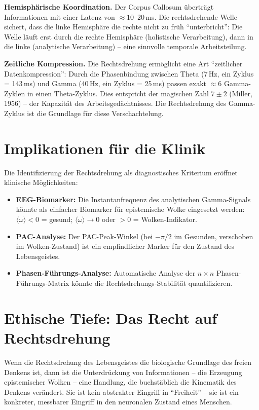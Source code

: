﻿\documentclass[12pt,a4paper]{report}
\theoremstyle{plain}
\theoremstyle{definition}
\theoremstyle{remark}
\begin{document}
	\textbf{Hemisphärische Koordination.}
	Der Corpus Callosum überträgt Informationen mit einer Latenz von
	$\approx 10$--$20$\,ms. Die rechtsdrehende Welle sichert, dass die
	linke Hemisphäre die rechte nicht zu früh ``unterbricht'': Die Welle
	läuft erst durch die rechte Hemisphäre (holistische Verarbeitung),
	dann in die linke (analytische Verarbeitung) -- eine sinnvolle
	temporale Arbeitsteilung.
	
	\textbf{Zeitliche Kompression.}
	Die Rechtsdrehung ermöglicht eine Art ``zeitlicher Datenkompression'':
	Durch die Phasenbindung zwischen Theta (7\,Hz, ein Zyklus = 143\,ms)
	und Gamma (40\,Hz, ein Zyklus = 25\,ms) passen exakt $\approx 6$ Gamma-Zyklen
	in einen Theta-Zyklus. Dies entspricht der magischen Zahl $7 \pm 2$
	(Miller, 1956) -- der Kapazität des Arbeitsgedächtnisses.
	Die Rechtsdrehung des Gamma-Zyklus ist die Grundlage für diese
	Verschachtelung.
	
	\section{Implikationen für die Klinik}
	
	Die Identifizierung der Rechtsdrehung als diagnostisches Kriterium
	eröffnet klinische Möglichkeiten:
	
	\begin{itemize}
		\item \textbf{EEG-Biomarker:} Die Instantanfrequenz des
		analytischen Gamma-Signals könnte als einfacher Biomarker
		für epistemische Wolke eingesetzt werden:
		$\langle\omega\rangle < 0$ = gesund;
		$\langle\omega\rangle \to 0$ oder $> 0$ = Wolken-Indikator.
		\item \textbf{PAC-Analyse:} Der PAC-Peak-Winkel (bei $-\pi/2$
		im Gesunden, verschoben im Wolken-Zustand) ist ein
		empfindlicher Marker für den Zustand des Lebensgeistes.
		\item \textbf{Phasen-Führungs-Analyse:} Automatische Analyse
		der $n \times n$ Phasen-Führungs-Matrix könnte die
		Rechtsdrehungs-Stabilität quantifizieren.
	\end{itemize}
	
	\section{Ethische Tiefe: Das Recht auf Rechtsdrehung}
	
	Wenn die Rechtsdrehung des Lebensgeistes die biologische Grundlage
	des freien Denkens ist, dann ist die Unterdrückung von Informationen --
	die Erzeugung epistemischer Wolken -- eine Handlung, die buchstäblich
	die Kinematik des Denkens verändert.
	Sie ist kein abstrakter Eingriff in ``Freiheit'' -- sie ist ein
	konkreter, messbarer Eingriff in den neuronalen Zustand eines Menschen.
	
\end{document}
